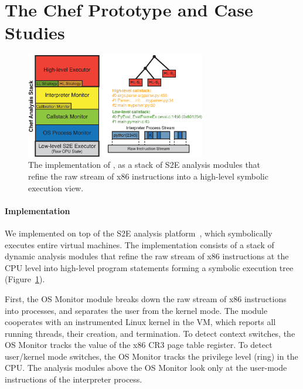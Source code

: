 
\section{The Chef Prototype and Case Studies}
\label{sec:eval:chef-proto}

\begin{figure}
  \centering
  \includegraphics[width=0.7\textwidth]{figures/evaluation/chef-implem-stack}
  \caption{The implementation of \chef, as a stack of S2E analysis modules that refine the raw stream of x86 instructions into a high-level symbolic execution view.}
  \label{fig:eval:chef-implem-stack}
\end{figure}

\paragraph{Implementation}

We implemented \chef on top of the S2E analysis platform~\cite{s2eSystem}, which symbolically executes entire virtual machines.
%
The implementation consists of a stack of dynamic analysis modules that refine the raw stream of x86 instructions at the CPU level into high-level program statements forming a symbolic execution tree (Figure~\ref{fig:eval:chef-implem-stack}).

First, the OS Monitor module breaks down the raw stream of x86 instructions into processes, and separates the user from the kernel mode.
%
The module cooperates with an instrumented Linux kernel in the VM, which reports all running threads, their creation, and termination.  To detect context switches, the OS Monitor tracks the value of the x86 CR3 page table register.  To detect user/kernel mode switches, the OS Monitor tracks the privilege level (ring) in the CPU.
%
The analysis modules above the OS Monitor look only at the user-mode instructions of the interpreter process.

